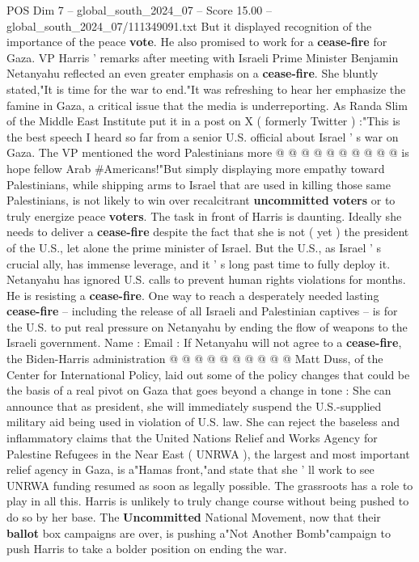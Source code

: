 \begin{textsample}{POS Dim 7 – global\_south\_2024\_07 – Score 15.00 – global\_south\_2024\_07/111349091.txt}
But it displayed recognition of the importance of the peace \textbf{vote}.
He also promised to work for a \textbf{cease-fire} for Gaza.
VP Harris ' remarks after meeting with Israeli Prime Minister Benjamin Netanyahu reflected an even greater emphasis on a \textbf{cease-fire}.
She bluntly stated,"It is time for the war to end."It was refreshing to hear her emphasize the famine in Gaza, a critical issue that the media is underreporting.
As Randa Slim of the Middle East Institute put it in a post on X ( formerly Twitter ) :"This is the best speech I heard so far from a senior U.S. official about Israel ' s war on Gaza.
The VP mentioned the word Palestinians more @ @ @ @ @ @ @ @ @ @ is hope fellow Arab \#Americans!"But simply displaying more empathy toward Palestinians, while shipping arms to Israel that are used in killing those same Palestinians, is not likely to win over recalcitrant \textbf{uncommitted} \textbf{voters} or to truly energize peace \textbf{voters}.
The task in front of Harris is daunting.
Ideally she needs to deliver a \textbf{cease-fire} despite the fact that she is not ( yet ) the president of the U.S., let alone the prime minister of Israel.
But the U.S., as Israel ' s crucial ally, has immense leverage, and it ' s long past time to fully deploy it.
Netanyahu has ignored U.S. calls to prevent human rights violations for months.
He is resisting a \textbf{cease-fire}.
One way to reach a desperately needed lasting \textbf{cease-fire} -- including the release of all Israeli and Palestinian captives -- is for the U.S. to put real pressure on Netanyahu by ending the flow of weapons to the Israeli government.
Name : Email : If Netanyahu will not agree to a \textbf{cease-fire}, the Biden-Harris administration @ @ @ @ @ @ @ @ @ @ Matt Duss, of the Center for International Policy, laid out some of the policy changes that could be the basis of a real pivot on Gaza that goes beyond a change in tone : She can announce that as president, she will immediately suspend the U.S.-supplied military aid being used in violation of U.S. law.
She can reject the baseless and inflammatory claims that the United Nations Relief and Works Agency for Palestine Refugees in the Near East ( UNRWA ), the largest and most important relief agency in Gaza, is a"Hamas front,"and state that she ' ll work to see UNRWA funding resumed as soon as legally possible.
The grassroots has a role to play in all this.
Harris is unlikely to truly change course without being pushed to do so by her base.
The \textbf{Uncommitted} National Movement, now that their \textbf{ballot} box campaigns are over, is pushing a"Not Another Bomb"campaign to push Harris to take a bolder position on ending the war.

\end{textsample}
